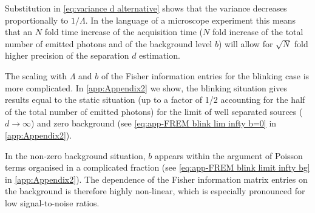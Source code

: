 Substitution in \autoref{eq:variance d alternative} shows that the variance decreases proportionally to $1/\Lambda$. In the language of a microscope experiment this means that an $N$ fold time increase of the acquisition time ($N$ fold increase of the total number of emitted photons and of the background level $b$) will allow for $\sqrt{N}$ fold higher precision of the separation $d$ estimation.

The scaling with $\Lambda$ and $b$ of the Fisher information entries for the blinking case is more complicated. In \autoref{app:Appendix2} we show, the blinking situation gives results equal to the static situation (up to a factor of 1/2 accounting for the half of the total number of emitted photons) for the limit of well separated sources ($d\rightarrow\infty$) and zero background (see \autoref{eq:app-FREM blink lim infty b=0} in \autoref{app:Appendix2}). 

In the non-zero background situation, $b$ appears within the argument of Poisson terms organised in a complicated fraction (see \autoref{eq:app-FREM blink limit infty bg} in \autoref{app:Appendix2}). The dependence of the Fisher information matrix entries on the background is therefore highly non-linear, which is especially pronounced for low signal-to-noise ratios.  



%
%




